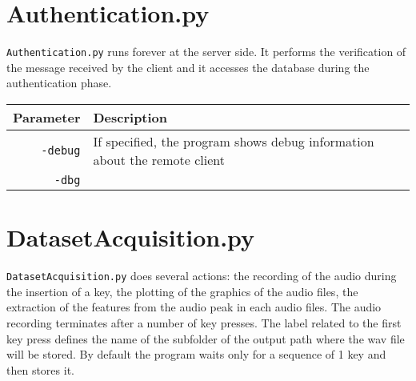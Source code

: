 \section{Authentication.py}
\texttt{Authentication.py} runs forever at the server side. It performs the verification of the message received by the client and it accesses the database during the authentication phase.
\begin{table}[h]
\centering\footnotesize
\begin{tabular}{rl}
\hline
\textbf{Parameter} & \textbf{Description}\\
\hline
\texttt{-debug} & If specified, the program shows debug information about the remote client\\
\texttt{-dbg} &\\
\hline
\end{tabular}
\end{table}

\section{DatasetAcquisition.py}
\texttt{DatasetAcquisition.py} does several actions: the recording of the audio during the insertion of a key, the plotting of the graphics of the audio files, the extraction of the features from the audio peak in each audio files. The audio recording terminates after a number of key presses. The label related to the first key press defines the name of the subfolder of the output path where the wav file will be stored. By default the program waits only for a sequence of 1 key and then stores it.

